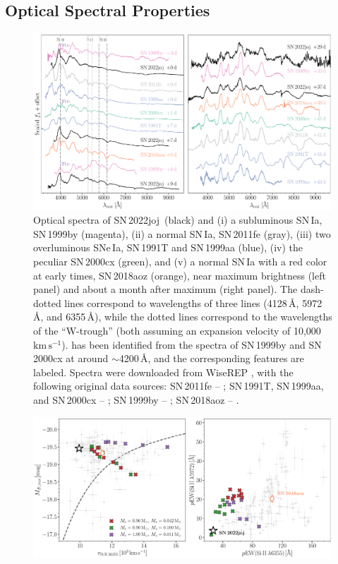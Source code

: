 \documentclass[twocolumn]{aastex631}
\newcommand{\sn}{SN\,2022joj}
\newcommand{\kms}{$\mathrm{km}\,\mathrm{s}^{-1}$}
\begin{document}
\begin{CJK*}{UTF8}{gbsn}
\subsection{Optical Spectral Properties} \label{sec:analysis_spec}
\begin{figure}
    \centering
    \includegraphics[width=\linewidth]{spec_comp.pdf}
    \caption{Optical spectra of \sn\ (black) and (i) a subluminous SN\,Ia, SN\,1999by (magenta), (ii) a normal SN\,Ia, SN\,2011fe (gray), (iii) two overluminous SNe\,Ia, SN\,1991T and SN\,1999aa (blue), (iv) the peculiar SN\,2000cx (green), and (v) a normal SN\,Ia with a red color at early times, SN\,2018aoz (orange), near maximum brightness (left panel) and about a month after maximum (right panel). The dash-dotted lines correspond to wavelengths of three  lines (4128\,\r{A}, 5972\,\r{A}, and 6355\,\r{A}), while the dotted lines correspond to the wavelengths of the  ``W-trough'' (both assuming an expansion velocity of 10,000\,\kms).  has been identified from the spectra of SN\,1999by and SN\,2000cx at around $\sim$4200\,\r{A}, and the corresponding features are labeled. Spectra were downloaded from WiseREP  \citep{wiserep_2012}, with the following original data sources: SN\,2011fe -- \citet{Pereira_2013, Mazzali_2014}; SN\,1991T, SN\,1999aa, and SN\,2000cx -- \citet{Silverman_UCBIa_2012}; SN\,1999by -- \citet{Matheson_cfaIa_2008}; SN\,2018aoz -- \citet{Ni_18aoz_2023}.
    }
    \label{fig:spec_comp}
\end{figure}
\begin{figure}
    \centering
    \includegraphics[width=\linewidth]{phase_space.pdf}

\end{figure}
\end{CJK*}
\end{document}

